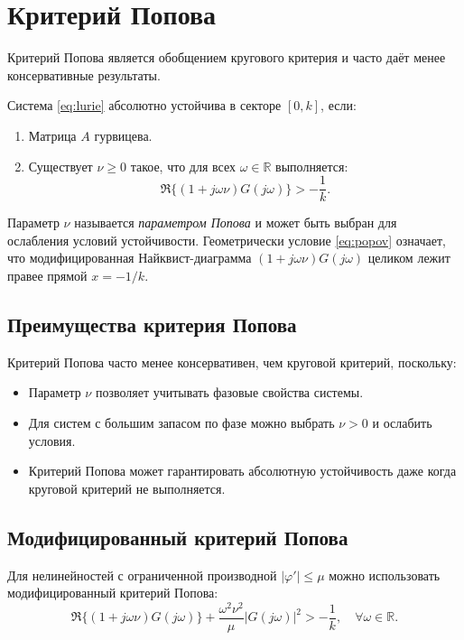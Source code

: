 \section{Критерий Попова}

Критерий Попова является обобщением кругового критерия и часто даёт менее консервативные результаты.

\begin{theorem}
Система \eqref{eq:lurie} абсолютно устойчива в секторе $[0, k]$, если:
\begin{enumerate}
    \item Матрица $A$ гурвицева.
    \item Существует $\nu\ge 0$ такое, что для всех $\omega\in\mathbb{R}$ выполняется:
    \begin{equation}
        \Re\big\{(1+j\omega\nu) G(j\omega)\big\} > -\frac{1}{k}.
        \label{eq:popov}
    \end{equation}
\end{enumerate}
\end{theorem}

Параметр $\nu$ называется \emph{параметром Попова} и может быть выбран для ослабления условий устойчивости. Геометрически условие \eqref{eq:popov} означает, что модифицированная Найквист-диаграмма $(1+j\omega\nu)G(j\omega)$ целиком лежит правее прямой $x = -1/k$.

\subsection{Преимущества критерия Попова}

Критерий Попова часто менее консервативен, чем круговой критерий, поскольку:
\begin{itemize}
    \item Параметр $\nu$ позволяет учитывать фазовые свойства системы.
    \item Для систем с большим запасом по фазе можно выбрать $\nu>0$ и ослабить условия.
    \item Критерий Попова может гарантировать абсолютную устойчивость даже когда круговой критерий не выполняется.
\end{itemize}

\subsection{Модифицированный критерий Попова}

Для нелинейностей с ограниченной производной $|\varphi'|\le\mu$ можно использовать модифицированный критерий Попова:
\begin{equation}
    \Re\big\{(1+j\omega\nu) G(j\omega)\big\} + \frac{\omega^2\nu^2}{\mu} |G(j\omega)|^2 > -\frac{1}{k}, \quad \forall \omega\in\mathbb{R}.
\end{equation}

